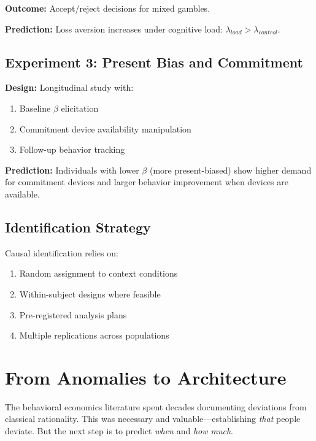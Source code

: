 \documentclass[12pt]{article}
\begin{document}
\textbf{Outcome:} Accept/reject decisions for mixed gambles.

\textbf{Prediction:} Loss aversion increases under cognitive load: $\lambda_{load} > \lambda_{control}$.

\subsection{Experiment 3: Present Bias and Commitment}

\textbf{Design:} Longitudinal study with:
\begin{enumerate}
    \item Baseline $\beta$ elicitation
    \item Commitment device availability manipulation
    \item Follow-up behavior tracking
\end{enumerate}

\textbf{Prediction:} Individuals with lower $\beta$ (more present-biased) show higher demand for commitment devices and larger behavior improvement when devices are available.

\subsection{Identification Strategy}

Causal identification relies on:
\begin{enumerate}
    \item Random assignment to context conditions
    \item Within-subject designs where feasible
    \item Pre-registered analysis plans
    \item Multiple replications across populations
\end{enumerate}



\section{From Anomalies to Architecture}
\label{sec:architecture}

The behavioral economics literature spent decades documenting deviations from classical rationality. This was necessary and valuable---establishing \textit{that} people deviate. But the next step is to predict \textit{when} and \textit{how much}.
\end{document}
